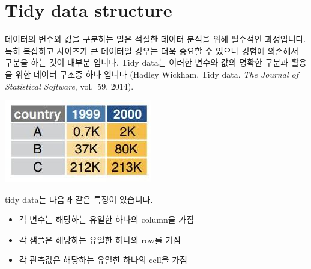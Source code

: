 \documentclass[
]{book}
\newenvironment{Shaded}{\begin{snugshade}}{\end{snugshade}}
\newcommand{\AttributeTok}[1]{\textcolor[rgb]{0.77,0.63,0.00}{#1}}
\newcommand{\DecValTok}[1]{\textcolor[rgb]{0.00,0.00,0.81}{#1}}
\newcommand{\FunctionTok}[1]{\textcolor[rgb]{0.00,0.00,0.00}{#1}}
\newcommand{\NormalTok}[1]{#1}
\newcommand{\OtherTok}[1]{\textcolor[rgb]{0.56,0.35,0.01}{#1}}
\newcommand{\SpecialCharTok}[1]{\textcolor[rgb]{0.00,0.00,0.00}{#1}}
\providecommand{\tightlist}{%
  \setlength{\itemsep}{0pt}\setlength{\parskip}{0pt}}
\begin{document}
\begin{Shaded}
\end{Shaded}

\hypertarget{tidy-data-structure}{%
\section{Tidy data structure}\label{tidy-data-structure}}

데이터의 변수와 값을 구분하는 일은 적절한 데이터 분석을 위해 필수적인 과정입니다. 특히 복잡하고 사이즈가 큰 데이터일 경우는 더욱 중요할 수 있으나 경험에 의존해서 구분을 하는 것이 대부분 입니다. Tidy data는 이러한 변수와 값의 명확한 구분과 활용을 위한 데이터 구조중 하나 입니다 (Hadley Wickham. Tidy data. \emph{The Journal of Statistical Software}, vol.~59, 2014).

\includegraphics{images/07/notidy.JPG}

tidy data는 다음과 같은 특징이 있습니다.

\begin{itemize}
\tightlist
\item
  각 변수는 해당하는 유일한 하나의 column을 가짐
\item
  각 샘플은 해당하는 유일한 하나의 row를 가짐
\item
  각 관측값은 해당하는 유일한 하나의 cell을 가짐
\end{itemize}
\end{document}
